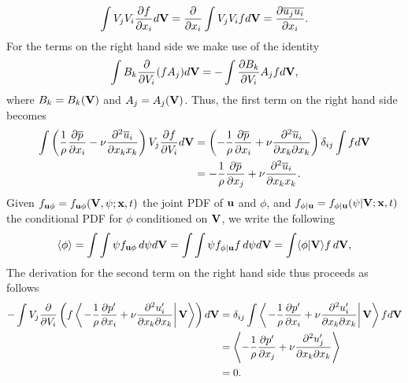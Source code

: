 \documentclass[oneside,a4paper,11pt]{report}
\newcommand{\pavg}{\overline{p}}
\newcommand{\uavg}{\overline{u}}
\newcommand{\pfluc}{p'}
\newcommand{\ufluc}{u'}
\begin{document}
\begin{equation}
\int V_j V_i \frac{\partial f}{\partial x_i} d\mathbf{V} = \frac{\partial}{\partial x_i} \int V_j V_i f d\mathbf{V} = \frac{\partial \overline{u_j u_i}}{\partial x_i}.
\end{equation} 
For the terms on the right hand side we make use of the identity
\begin{equation}
\int B_k \frac{\partial}{\partial V_i} ( f A_j ) d\mathbf{V} = - \int \frac{\partial B_k}{\partial V_i} A_j f d\mathbf{V},
\end{equation}
where $B_k = B_k(\mathbf{V})$ and $A_j = A_j(\mathbf{V})$.
Thus, the first term on the right hand side becomes
\begin{align}
\int \left ( \frac{1}{\rho} \frac{\partial \pavg}{\partial x_i} -\nu \frac{\partial^2 \uavg_i}{\partial x_k x_k} \right) V_j \frac{\partial f}{\partial V_i} d\Vvec & = \left (- \frac{1}{\rho} \frac{\partial \pavg}{\partial x_i} + \nu \frac{\partial^2 \uavg_i}{\partial x_k \partial x_k} \right) \delta_{ij} \int f d\Vvec \nonumber \\
& = -\frac{1}{\rho} \frac{\partial \pavg}{\partial x_j} + \nu \frac{\partial ^2 \uavg_i}{\partial x_k x_k}.
\end{align}
Given $f_{\mathbf{u} \phi} = f_{\mathbf{u} \phi}(\mathbf{V}, \psi; \mathbf{x}, t)$ the joint PDF of $\mathbf{u}$ and $\phi$, and $f_{\phi | \mathbf{u}} = f_{\phi | \mathbf{u}}(\psi | \mathbf{V}; \mathbf{x}, t)$ the conditional PDF for $\phi$ conditioned on $\mathbf{V}$, we write the following 
\begin{equation}
\langle \phi \rangle = \int \int \psi f_{\mathbf{u} \phi} \, d\psi d\mathbf{V} = \int \int \psi f_{\phi | \mathbf{u}} f \, d\psi d\mathbf{V} = \int \langle \phi | \mathbf{V} \rangle f \, d\mathbf{V},
\end{equation}
The derivation for the second term on the right hand side thus proceeds as follows
\begin{align}
-\int V_j \frac{\partial}{\partial V_i} \left ( f \left < \left . - \frac{1}{\rho} \frac{\partial \pfluc}{\partial x_i} + \nu \frac{\partial^2 \ufluc_i}{\partial x_k \partial x_k} \right | \Vvec \right > \right ) d\Vvec &= \delta_{ij} \int \left < \left . - \frac{1}{\rho} \frac{\partial \pfluc}{\partial x_i} + \nu \frac{\partial^2 \ufluc_i}{\partial x_k \partial x_k} \right | \Vvec \right > f d\Vvec \nonumber \\
& = \left < - \frac{1}{\rho} \frac{\partial \pfluc}{\partial x_j} + \nu \frac{\partial^2 \ufluc_j}{\partial x_k \partial x_k} \right > \nonumber \\
& = 0.
\end{align}
\end{document}
